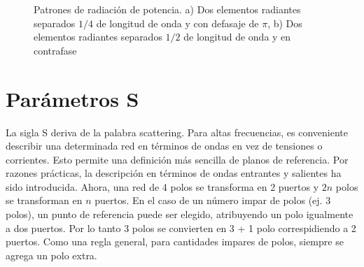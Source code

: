 \begin{figure}[H]
	\centering
	\caption{Patrones de radiación de potencia. a) Dos elementos radiantes separados $1/4$ de longitud de onda y con 
		defasaje de $\pi$, b) Dos elementos radiantes separados $1/2$ de longitud de onda y en contrafase}
	\label{fig:directArrayPat}
\end{figure}


\section{Parámetros S}

La sigla S deriva de la palabra scattering. Para altas frecuencias, es conveniente describir una
determinada red en términos de ondas en vez de tensiones o corrientes. Esto permite una definición más 
sencilla de planos de referencia. Por razones prácticas, la descripción en términos de ondas entrantes
y salientes ha sido introducida. Ahora, una red de 4 polos se transforma en 2 puertos y $2n$ polos se 
transforman en $n$ puertos. En el caso de un número impar de polos (ej. 3 polos), un punto de referencia
puede ser elegido, atribuyendo un polo igualmente a dos puertos. Por lo tanto 3 polos se convierten en 
3 + 1 polo correspidiendo a 2 puertos. Como una regla general, para cantidades impares de polos, siempre
se agrega un polo extra.

